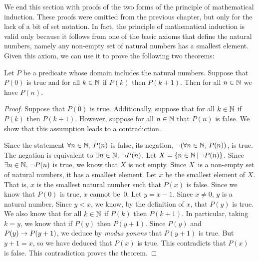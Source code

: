 \medskip

We end this section with proofs of the two forms of the principle of mathematical induction.
These proofs were omitted from the previous chapter, but only for the lack of a bit of set notation.
In fact, the principle of mathematical induction is valid only because it follows from one of the basic axioms that define the natural numbers, namely any non-empty set of natural numbers has a smallest element.
Given this axiom, we can use it to prove the following two theorems:


\begin{theorem}\label{T-induction}
Let $P$ be a predicate whose domain includes the natural numbers.
Suppose that $P(0)$ is true and for all $k\in {\mathbb N}$ if $P(k)$ then $P(k+1)$.
Then for all $n\in{\mathbb N}$ we have $P(n)$.
\end{theorem}
\begin{proof}
Suppose that $P(0)$ is true. 
Additionally, suppose that for all $k\in {\mathbb N}$ if $P(k)$ then $P(k+1)$.
However, suppose for all $n\in {\mathbb N}$ that $P(n)$ is false.
We show that this assumption leads to a contradiction.

Since the statement $\forall n\in{\mathbb N},\,P(n)$ is false, its negation, $\lnot(\forall n\in{\mathbb N},\,P(n))$, is true.
The negation is equivalent to $\exists n\in{\mathbb N},\,\lnot P(n)$.
Let $X=\{n\in{\mathbb N}\,|\, \lnot P(n)\}$.
Since $\exists n\in{\mathbb N},\,\lnot P(n)$ is true, we know that $X$ is not empty.
Since $X$~is a non-empty set of natural numbers, it has a smallest element.
Let $x$ be the smallest element of $X$.
That is, $x$ is the smallest natural number such that $P(x)$ is false.
Since we know that $P(0)$ is true, $x$ cannot be~0.
Let $y=x-1$.
Since $x\not=0$, $y$ is a natural number.
Since $y<x$, we know, by the definition of $x$, that $P(y)$ is true.
We also know that for all $k\in{\mathbb N}$ if $P(k)$ then $P(k+1)$.
In particular, taking $k=y$, we know that if $P(y)$ then $P(y+1)$.
Since $P(y)$ and $P(y)\rightarrow P(y+1)$, we deduce by \textit{modus ponens} that $P(y+1)$ is true.
But $y+1=x$, so we have deduced that $P(x)$ is true.
This contradicts that $P(x)$ is false.
This contradiction proves the theorem.
\end{proof}


